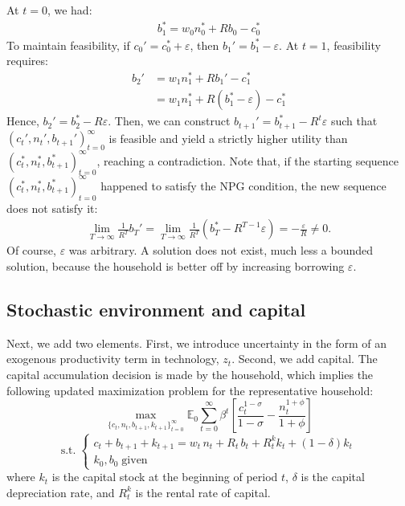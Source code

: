 \documentclass[dvipsnames,11pt]{article}
\begin{document}
\begin{enumerate}
\begin{solution}
   At $t=0$, we had:
   \begin{align*}
       b_1^*=w_0n_0^* +Rb_0-c_0^*
   \end{align*}
   To maintain feasibility, if $c_0'=c_0^*+\varepsilon$, then $b_1'=b_1^*-\varepsilon$. At $t=1$, feasibility requires:
   \begin{align*}
       b_2'&=w_1n_1^*+Rb_1'-c_1^* \\
       &= w_1n_1^*+R(b_1^*-\varepsilon)-c_1^*
   \end{align*}
   Hence, $b_2'=b_2^*-R\varepsilon$. Then, we can construct $b_{t+1}'=b_{t+1}^*-R^t\varepsilon$ such that $(c_t',n_t',b_{t+1}')_{t=0}^\infty$ is feasible and yield a strictly higher utility than $(c_t^*,n_t^*,b_{t+1}^*)_{t=0}^\infty$, reaching a contradiction. Note that, if the starting sequence $(c_t^*,n_t^*,b_{t+1}^*)_{t=0}^\infty$ happened to satisfy the NPG condition, the new sequence does not satisfy it:
   \begin{align*}
       \lim_{T \to \infty} \frac{1}{R^T}b_T'=\lim_{T \to \infty} \frac{1}{R^T}(b_T^*-R^{T-1}\varepsilon) = -\frac{\varepsilon}{R} \neq 0.
   \end{align*}
   Of course, $\varepsilon$ was arbitrary. A solution does not exist, much less a bounded solution, because the household is better off by increasing borrowing $\varepsilon$.
            \end{solution}

    
        \end{enumerate}

    \subsection{Stochastic environment and capital}

        Next, we add two elements. First, we introduce uncertainty in the form of an exogenous productivity term in technology, $z_t$. Second, we add capital. The capital accumulation decision is made by the household, which implies the following updated maximization problem for the representative household: 
        \[
        \max_{\{c_t,n_t,b_{t+1}, k_{t+1}\}_{t=0}^{\infty}} \mathbb{E}_0 \sum_{t=0}^\infty \beta^t\left[\frac{c_t^{1-\sigma}}{1-\sigma} - \frac{n_t^{1+\phi}}{1+\phi}\right]
        \]
        \[
        \mathrm{s.t.}\;
        \begin{cases}
        c_t + b_{t+1} + k_{t+1} = w_t\,n_t + R_{t}\,b_t + R_t^k k_t + (1-\delta) k_t
        \\
        k_0, b_0 \;\text{given}
        \end{cases}
        \]
        where $k_t$ is the capital stock at the beginning of period $t$, $\delta$ is the capital depreciation rate, and $R_t^k$ is the rental rate of capital. 
\end{document}
